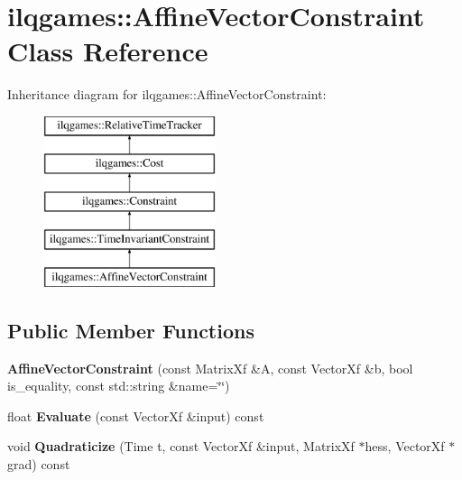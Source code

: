 \hypertarget{classilqgames_1_1_affine_vector_constraint}{}\section{ilqgames\+:\+:Affine\+Vector\+Constraint Class Reference}
\label{classilqgames_1_1_affine_vector_constraint}
Inheritance diagram for ilqgames\+:\+:Affine\+Vector\+Constraint\+:\begin{figure}[H]
\begin{center}
\leavevmode
\includegraphics[height=5.000000cm]{classilqgames_1_1_affine_vector_constraint}
\end{center}
\end{figure}
\subsection*{Public Member Functions}
\begin{DoxyCompactItemize}
\item 
{\bfseries Affine\+Vector\+Constraint} (const Matrix\+Xf \&A, const Vector\+Xf \&b, bool is\+\_\+equality, const std\+::string \&name=\char`\"{}\char`\"{})\hypertarget{classilqgames_1_1_affine_vector_constraint_a41f307e9721567e3cacd094027bba73b}{}\label{classilqgames_1_1_affine_vector_constraint_a41f307e9721567e3cacd094027bba73b}

\item 
float {\bfseries Evaluate} (const Vector\+Xf \&input) const \hypertarget{classilqgames_1_1_affine_vector_constraint_a97afa363c56d4cae7f30c4d6cee7ede4}{}\label{classilqgames_1_1_affine_vector_constraint_a97afa363c56d4cae7f30c4d6cee7ede4}

\item 
void {\bfseries Quadraticize} (Time t, const Vector\+Xf \&input, Matrix\+Xf $\ast$hess, Vector\+Xf $\ast$grad) const \hypertarget{classilqgames_1_1_affine_vector_constraint_a3a8ac4cdc033831cbd2f0eed7248f6cc}{}\label{classilqgames_1_1_affine_vector_constraint_a3a8ac4cdc033831cbd2f0eed7248f6cc}

\end{DoxyCompactItemize}
